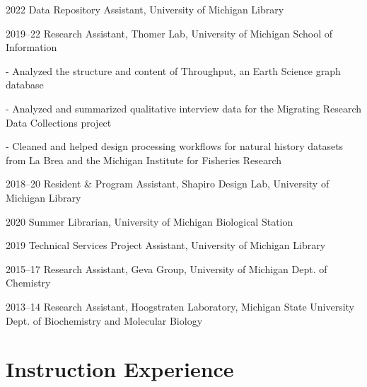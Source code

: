 \documentclass[12pt,letterpaper]{report}
\newcommand{\listitemspace}{0.25em}
\renewenvironment{itemize}
{\begin{list}{}{\setlength{\leftmargin}{0em}
            \setlength{\parskip}{0em}
            \setlength{\itemsep}{\listitemspace}
            \setlength{\parsep}{\listitemspace}}}
{\end{list}}
\begin{document}
\begin{tablist}

	\item[2022] \tab Data Repository Assistant, University of Michigan Library
    
	\item[2019--22] \tab Research Assistant, Thomer Lab, University of Michigan School of Information

	\begin{itemize} \begin{footnotesize}

		\item - Analyzed the structure and content of Throughput, an Earth Science graph database
		
		\item - Analyzed and summarized qualitative interview data for the Migrating Research Data Collections project

		\item - Cleaned and helped design processing workflows for natural history datasets from La Brea and the Michigan Institute for Fisheries Research

	\end{footnotesize} \end{itemize}
        
	\item[2018--20] \tab Resident \& Program Assistant, Shapiro Design Lab, University of Michigan Library

	\item[2020] \tab Summer Librarian, University of Michigan Biological Station
    
	\item[2019] \tab Technical Services Project Assistant, University of Michigan Library

	\item[2015--17] \tab Research Assistant, Geva Group, University of Michigan Dept. of Chemistry
	
	\item[2013--14] \tab Research Assistant, Hoogstraten Laboratory, Michigan State University Dept. of Biochemistry and Molecular Biology

\end{tablist}



\section*{Instruction Experience}
\end{document}
